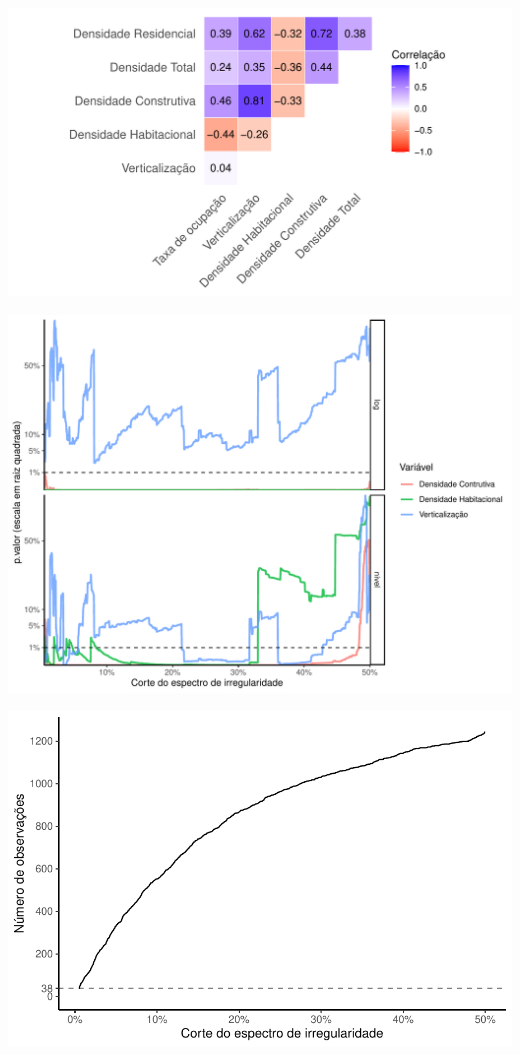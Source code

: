 \documentclass[%
    8pt, 
    aspectratio=169,
]{beamer}
\begin{document}
\begin{frame}
    \centering
    \includegraphics[width = \textheight]{imagens/corrplot.pdf}
\end{frame}

\begin{frame}
    \centering
    \label{appendix:robustez}
    \includegraphics[width = \textheight]{imagens/pvals.pdf}
\end{frame}

\begin{frame}
    \centering
    \includegraphics[width = \textheight]{imagens/nobs.pdf}
\end{frame}
\end{document}
